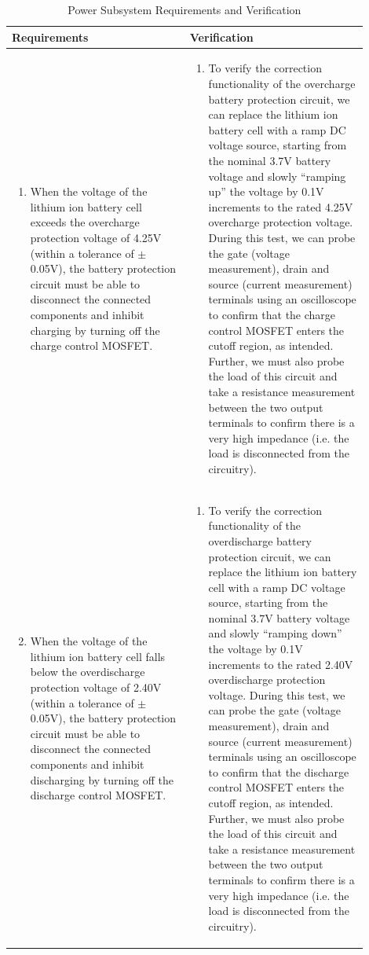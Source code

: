 \documentclass[12pt]{article}
\begin{document}
\begin{table}[!h]
	\caption{Power Subsystem Requirements and Verification}
	\label{tab:p}
	\centering
	{\small
	\begin{tabular}{| p{0.45\linewidth} | p{0.45\linewidth} |}
 		\hline
 		\textbf{Requirements} & \textbf{Verification} \\ 
 		\hline
 		\begin{enumerate}
 			\item When the voltage of the lithium ion battery cell exceeds the overcharge protection voltage of 4.25V (within a tolerance of $\pm$0.05V), the battery protection circuit must be able to disconnect the connected components and inhibit charging by turning off the charge control MOSFET. 
		\end{enumerate} & \begin{enumerate}[label=\alph*)]
 			\item To verify the correction functionality of the overcharge battery protection circuit, we can replace the lithium ion battery cell with a ramp DC voltage source, starting from the nominal 3.7V battery voltage and slowly ``ramping up'' the voltage by 0.1V increments to the rated 4.25V overcharge protection voltage. During this test, we can probe the gate (voltage measurement), drain and source (current measurement) terminals using an oscilloscope to confirm that the charge control MOSFET enters the cutoff region, as intended. Further, we must also probe the load of this circuit and take a resistance measurement between the two output terminals to confirm there is a very high impedance (i.e. the load is disconnected from the circuitry).
		\end{enumerate} \\
		\hline
		\begin{enumerate}
		\setcounter{enumi}{1}
 			\item When the voltage of the lithium ion battery cell falls below the overdischarge protection voltage of 2.40V (within a tolerance of $\pm$0.05V), the battery protection circuit must be able to disconnect the connected components and inhibit discharging by turning off the discharge control MOSFET.
		\end{enumerate} & \begin{enumerate}[label=\alph*)]
 			\item To verify the correction functionality of the overdischarge battery protection circuit, we can replace the lithium ion battery cell with a ramp DC voltage source, starting from the nominal 3.7V battery voltage and slowly ``ramping down'' the voltage by 0.1V increments to the rated 2.40V overdischarge protection voltage. During this test, we can probe the gate (voltage measurement), drain and source (current measurement) terminals using an oscilloscope to confirm that the discharge control MOSFET enters the cutoff region, as intended. Further, we must also probe the load of this circuit and take a resistance measurement between the two output terminals to confirm there is a very high impedance (i.e. the load is disconnected from the circuitry).

\end{enumerate}
\end{tabular}}
\end{table}
\end{document}
